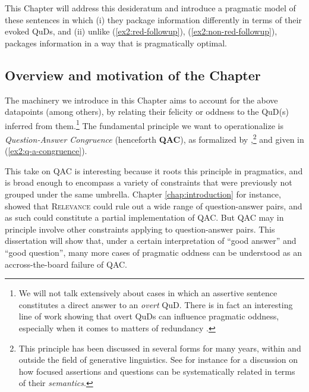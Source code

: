 This Chapter will address this desideratum and introduce a pragmatic model of these sentences in which (i) they package information differently in terms of their evoked QuDs, and (ii) unlike (\ref{ex2:red-followup}), (\ref{ex2:non-red-followup}), packages information in a way that is pragmatically optimal.

\subsection{Overview  and motivation of the Chapter}
The machinery we introduce in this Chapter aims to account for the above datapoints (among others), by relating their felicity or oddness to the QuD(s) inferred from them.\footnote{We will not talk extensively about cases in which an assertive sentence constitutes a direct answer to an \textit{overt} QuD. There is in fact an interesting line of work showing that overt QuDs can influence pragmatic oddness, especially when it comes to matters of redundancy \citep{Haslinger2023}.} The fundamental principle we want to operationalize is \textit{Question-Answer Congruence} (henceforth \textbf{QAC}), as formalized by \citet{Katzir2015},\footnote{This principle has been discussed in several forms for many years, within and outside the field of generative linguistics. See for instance \citet{Rooth1992} for a discussion on how focused assertions and questions can be systematically related in terms of their \textit{semantics}.} and given in (\ref{ex2:q-a-congruence}). 

\begin{exe}
	\label{ex2:q-a-congruence}
\end{exe}

This take on QAC is interesting because it roots this principle in pragmatics, and is broad enough to encompass a variety of constraints that were previously not grouped under the same umbrella. Chapter \ref{chap:introduction} for instance, showed that \textsc{Relevance} could rule out a wide range of question-answer pairs, and as such could constitute a partial implementation of QAC. But QAC may in principle involve other constraints applying to question-answer pairs. This dissertation will show that, under a certain interpretation of ``good answer'' and ``good question'', many more cases of pragmatic oddness can be understood as an accross-the-board failure of QAC.

